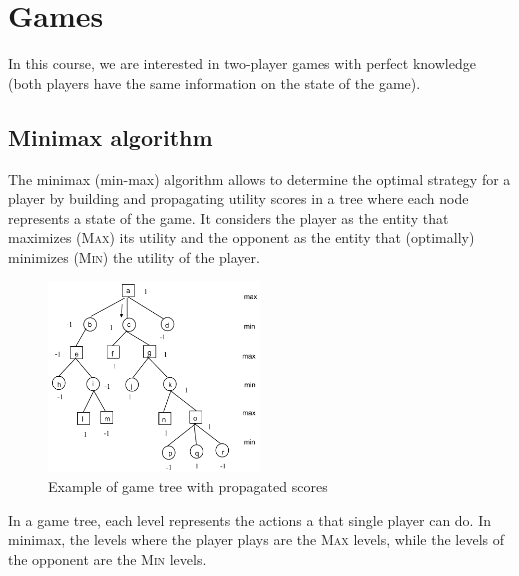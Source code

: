 \chapter{Games}

In this course, we are interested in two-player games with 
perfect knowledge (both players have the same information on the state of the game).


\section{Minimax algorithm}
The minimax (min-max) algorithm allows to determine the optimal strategy for a player by
building and propagating utility scores in a tree where each node represents a state of the game.
It considers the player as the entity that maximizes (\textsc{Max}) its utility and
the opponent as the entity that (optimally) minimizes (\textsc{Min}) the utility of the player.


\begin{figure}[h]
    \centering
    \includegraphics[width=0.5\textwidth]{img/_minmax.pdf}
    \caption{Example of game tree with propagated scores}
\end{figure}

In a game tree, each level represents the actions a that single player can do.
In minimax, the levels where the player plays are the \textsc{Max} levels, 
while the levels of the opponent are the \textsc{Min} levels.


